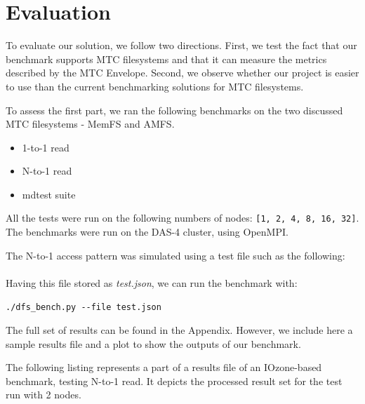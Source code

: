 
\chapter{Evaluation} %

\label{Chapter4} %


To evaluate our solution, we follow two directions. First, we test the fact that our benchmark supports MTC filesystems and that it can measure the metrics described by the MTC Envelope. Second, we observe whether our project is easier to use than the current benchmarking solutions for MTC filesystems.

To assess the first part, we ran the following benchmarks on the two discussed MTC filesystems - MemFS and AMFS.

\begin{itemize}

\item 1-to-1 read
\item N-to-1 read
\item mdtest suite

\end{itemize}

All the tests were run on the following numbers of nodes: \texttt{[1, 2, 4, 8, 16, 32]}. The benchmarks were run on the DAS-4 cluster, using OpenMPI.

The N-to-1 access pattern was simulated using a test file such as the following:\\\\



Having this file stored as \textit{test.json}, we can run the benchmark with:

\begin{verbatim}
./dfs_bench.py --file test.json
\end{verbatim}

The full set of results can be found in the Appendix. However, we include here a sample results file and a plot to show the outputs of our benchmark.

The following listing represents a part of a results file of an IOzone-based benchmark, testing N-to-1 read. It depicts the processed result set for the test run with 2 nodes.

